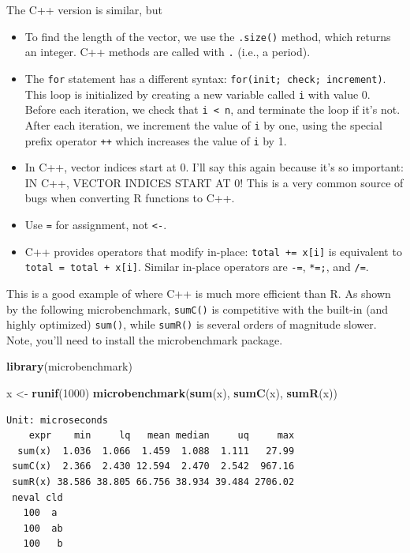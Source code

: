 \documentclass[
]{krantz}
\makeatletter
\newenvironment{Shaded}{\begin{snugshade}}{\end{snugshade}}
\newcommand{\DecValTok}[1]{\textcolor[rgb]{0.06,0.06,0.06}{#1}}
\newcommand{\KeywordTok}[1]{\textcolor[rgb]{0.27,0.27,0.27}{\textbf{#1}}}
\newcommand{\NormalTok}[1]{#1}
\newcommand{\StringTok}[1]{\textcolor[rgb]{0.5,0.5,0.5}{#1}}
\newenvironment{kframe}{%
\medskip{}
\setlength{\fboxsep}{.8em}
 \def\at@end@of@kframe{}%
 \ifinner\ifhmode%
  \def\at@end@of@kframe{\end{minipage}}%
  \begin{minipage}{\columnwidth}%
 \fi\fi%
 \def\FrameCommand##1{\hskip\@totalleftmargin \hskip-\fboxsep
 \colorbox{shadecolor}{##1}\hskip-\fboxsep
     \hskip-\linewidth \hskip-\@totalleftmargin \hskip\columnwidth}%
 \MakeFramed {\advance\hsize-\width
   \@totalleftmargin\z@ \linewidth\hsize
   \@setminipage}}%
 {\par\unskip\endMakeFramed%
 \at@end@of@kframe}
\renewenvironment{Shaded}{\begin{kframe}}{\end{kframe}}
\makeatother
\begin{document}
The C++ version is similar, but

\begin{itemize}
\item
  To find the length of the vector, we use the \texttt{.size()} method, which returns an integer. C++ methods are called with \texttt{.} (i.e., a period).
\item
  The \texttt{for} statement has a different syntax: \texttt{for(init;\ check;\ increment)}. This loop is initialized by creating a new variable called \texttt{i} with value 0. Before each iteration, we check that \texttt{i\ \textless{}\ n}, and terminate the loop if it's not. After each iteration, we increment the value of \texttt{i} by one, using the special prefix operator \texttt{++} which increases the value of \texttt{i} by 1.
\item
  In C++, vector indices start at 0. I'll say this again because it's so important: IN C++, VECTOR INDICES START AT 0! This is a very common source of bugs when converting R functions to C++.
\item
  Use \texttt{=} for assignment, not \texttt{\textless{}-}.
\item
  C++ provides operators that modify in-place: \texttt{total\ +=\ x{[}i{]}} is equivalent to \texttt{total\ =\ total\ +\ x{[}i{]}}. Similar in-place operators are \texttt{-=}, \texttt{*=;}, and \texttt{/=}.
\end{itemize}

This is a good example of where C++ is much more efficient than R. As shown by the following microbenchmark, \texttt{sumC()} is competitive with the built-in (and highly optimized) \texttt{sum()}, while \texttt{sumR()} is several orders of magnitude slower. Note, you'll need to install the microbenchmark package.

\begin{Shaded}
\begin{Highlighting}[]
\KeywordTok{library}\NormalTok{(microbenchmark)}

\NormalTok{x \textless{}{-}}\StringTok{ }\KeywordTok{runif}\NormalTok{(}\DecValTok{1000}\NormalTok{)}
\KeywordTok{microbenchmark}\NormalTok{(}\KeywordTok{sum}\NormalTok{(x), }\KeywordTok{sumC}\NormalTok{(x), }\KeywordTok{sumR}\NormalTok{(x))}
\end{Highlighting}
\end{Shaded}

\begin{verbatim}
Unit: microseconds
    expr    min     lq   mean median     uq     max
  sum(x)  1.036  1.066  1.459  1.088  1.111   27.99
 sumC(x)  2.366  2.430 12.594  2.470  2.542  967.16
 sumR(x) 38.586 38.805 66.756 38.934 39.484 2706.02
 neval cld
   100  a 
   100  ab
   100   b
\end{verbatim}
\end{document}
